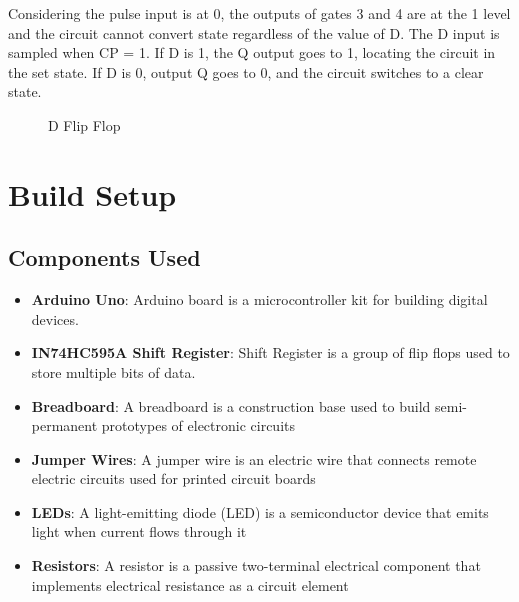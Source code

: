 \documentclass[12pt, a4paper, oneside]{report}
\begin{document}
Considering the pulse input is at 0, the outputs of gates 3 and 4 are at the 1 level and the circuit cannot convert state regardless of the value of D. The D input is sampled when CP = 1. If D is 1, the Q output goes to 1, locating the circuit in the set state. If D is 0, output Q goes to 0, and the circuit switches to a clear state.

\begin{figure}[h]
    \centering
    \caption{D Flip Flop}
\end{figure}

\chapter{Build Setup}
\section{Components Used}

\begin{itemize}
    \item \textbf{Arduino Uno}: Arduino board is a microcontroller kit for building digital devices.
    \item \textbf{IN74HC595A Shift Register}: Shift Register is a group of flip flops used to store multiple bits of data.
    \item \textbf{Breadboard}: A breadboard is a construction base used to build semi-permanent prototypes of electronic circuits
    \item \textbf{Jumper Wires}: A jumper wire is an electric wire that connects remote electric circuits used for printed circuit boards
    \item \textbf{LEDs}: A light-emitting diode (LED) is a semiconductor device that emits light when current flows through it
    \item \textbf{Resistors}: A resistor is a passive two-terminal electrical component that implements electrical resistance as a circuit element
\end{itemize}
\end{document}
